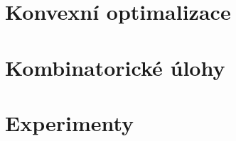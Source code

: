 \documentclass[a4paper,oneside,12pt]{book}
\theoremstyle{definition}
\theoremstyle{plain}
\theoremstyle{remark}
\begin{document}
\tableofcontents

\setcounter{page}{1}

\pagebreak


{
  \pagestyle{plain}
  
  
  
  \clearpage
}


\part{Konvexní optimalizace}









\clearpage


\part{Kombinatorické úlohy}







\clearpage


\part{Experimenty}





\clearpage




\clearpage




\end{document}
